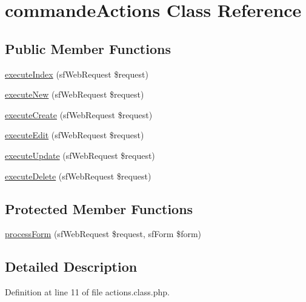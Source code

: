 \hypertarget{classcommande_actions}{\section{commande\-Actions Class Reference}
\label{classcommande_actions}
}
\subsection*{Public Member Functions}
\begin{DoxyCompactItemize}
\item 
\hyperlink{classcommande_actions_a948cc911eb1d9f77990be54af3b2080f}{execute\-Index} (sf\-Web\-Request \$request)
\item 
\hyperlink{classcommande_actions_a0ffbea56560c6c633dae68ec22aff21c}{execute\-New} (sf\-Web\-Request \$request)
\item 
\hyperlink{classcommande_actions_a75837617743fb64dca82d8133b2c662a}{execute\-Create} (sf\-Web\-Request \$request)
\item 
\hyperlink{classcommande_actions_af4d8fedd4b28f3398826a1bb8fa54394}{execute\-Edit} (sf\-Web\-Request \$request)
\item 
\hyperlink{classcommande_actions_af7b4f51862add3c2ebb54efc136a0840}{execute\-Update} (sf\-Web\-Request \$request)
\item 
\hyperlink{classcommande_actions_a52b5b11b11a0070dd2662257520c045a}{execute\-Delete} (sf\-Web\-Request \$request)
\end{DoxyCompactItemize}
\subsection*{Protected Member Functions}
\begin{DoxyCompactItemize}
\item 
\hyperlink{classcommande_actions_a7cf661d837626e0320753cbffa019a01}{process\-Form} (sf\-Web\-Request \$request, sf\-Form \$form)
\end{DoxyCompactItemize}


\subsection{Detailed Description}


Definition at line 11 of file actions.\-class.\-php.




